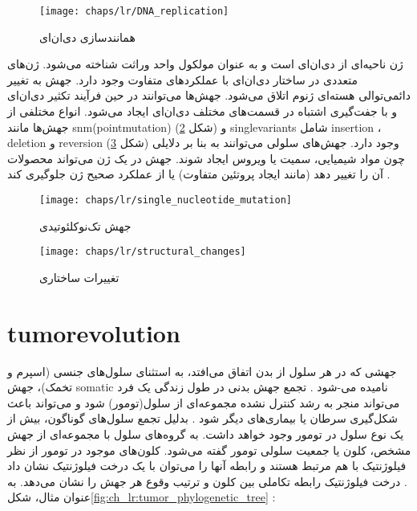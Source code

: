 \begin{figure}[!ht]
	\centerline{\texttt{[image: chaps/lr/DNA\_replication]}}
	\caption{همانندسازی دی‌ان‌ای}
	\label{fig:ch_lr:DNA_replication}
\end{figure}





ژن ناحیه‌ای از دی‌ان‌ای است و به عنوان مولکول واحد وراثت شناخته می‌شود. ژن‌های متعددی در ساختار دی‌ان‌ای با عملکرد‌های متفاوت وجود دارد. جهش به تغییر دائمی‌توالی هسته‌ای ژنوم اتلاق می‌شود. جهش‌ها می‌توانند در حین فرآیند تکثیر دی‌ان‌ای و با جفت‌گیری اشتباه در قسمت‌های مختلف دی‌ان‌ای ایجاد می‌شود. انواع مختلفی از جهش‌ها مانند \gls{snm}(\gls{pointmutation})  (شکل \ref{fig:ch_lr:single_nucleotide_mutation}) و  \glspl{singlevariant}  شامل \gls{insertion} ، \gls{deletion}  و \gls{reversion}  (شکل \ref{fig:ch_lr:structural_changes}) وجود دارد. جهش‌های سلولی می‌توانند به بنا بر دلایلی چون مواد شیمیایی، سمیت یا ویروس ایجاد شوند. جهش در یک ژن می‌تواند محصولات آن را تغییر دهد (مانند ایجاد پروتئین متفاوت) یا از عملکرد صحیح ژن جلوگیری کند \cite{alberts2002molecular}.




\begin{figure}[!ht]
	\centerline{\texttt{[image: chaps/lr/single\_nucleotide\_mutation]}}
	\caption{جهش تک‌نوکلئوتیدی}
	\label{fig:ch_lr:single_nucleotide_mutation}
\end{figure}



\begin{figure}[!ht]
	\centerline{\texttt{[image: chaps/lr/structural\_changes]}}
	\caption{تغییرات ساختاری}
	\label{fig:ch_lr:structural_changes}
\end{figure}




\section{\gls{tumorevolution}}


جهشی که در هر سلول از بدن اتفاق می‌افتد، به استثنای سلول‌های جنسی (اسپرم و تخمک)، جهش \gls{somatic}  نامیده می-شود \cite{somaticMutation}. تجمع جهش بدنی در طول زندگی یک فرد می‌تواند منجر به رشد کنترل نشده مجموعه‌ای از سلول(تومور) شود \cite{nowell1976clonal} و می‌تواند باعث شکل‌گیری سرطان یا بیماری‌های دیگر شود \cite{somaticMutation}. بدلیل تجمع سلول‌های گوناگون، بیش از یک نوع سلول در تومور وجود خواهد داشت. به گروه‌های سلول با مجموعه‌ای از جهش مشخص، کلون یا جمعیت سلولی تومور گفته می‌شود. کلون‌های موجود در تومور از نظر فیلوژنتیک با هم مرتبط هستند و رابطه آنها را می‌توان با یک درخت فیلوژنتیک نشان داد \cite{birbrair2014type}. درخت فیلوژنتیک رابطه تکاملی بین کلون و ترتیب وقوع هر جهش را نشان می‌دهد. به عنوان مثال، شکل\ref{fig:ch_lr:tumor_phylogenetic_tree} :

